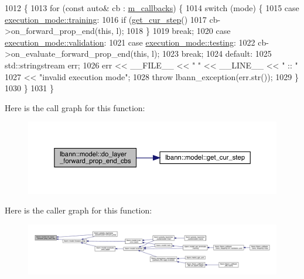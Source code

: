 \begin{DoxyCode}
1012                                                                        \{
1013   \textcolor{keywordflow}{for} (\textcolor{keyword}{const} \textcolor{keyword}{auto}& cb : \hyperlink{classlbann_1_1model_a07b511fef30368494c2ad80922ffd0eb}{m\_callbacks}) \{
1014     \textcolor{keywordflow}{switch} (mode) \{
1015     \textcolor{keywordflow}{case} \hyperlink{base_8hpp_a2781a159088df64ed7d47cc91c4dc0a8ac185ddac8b5a8f5aa23c5b80bc12d214}{execution\_mode::training}:
1016       \textcolor{keywordflow}{if} (\hyperlink{classlbann_1_1model_ad0cdcba177434b52dc9c4a97be183a92}{get\_cur\_step}() %
1017         cb->on\_forward\_prop\_end(\textcolor{keyword}{this}, l);
1018       \}
1019       \textcolor{keywordflow}{break};
1020     \textcolor{keywordflow}{case} \hyperlink{base_8hpp_a2781a159088df64ed7d47cc91c4dc0a8aa617908b172c473cb8e8cda059e55bf0}{execution\_mode::validation}:
1021     \textcolor{keywordflow}{case} \hyperlink{base_8hpp_a2781a159088df64ed7d47cc91c4dc0a8aae2b1fca515949e5d54fb22b8ed95575}{execution\_mode::testing}:
1022       cb->on\_evaluate\_forward\_prop\_end(\textcolor{keyword}{this}, l);
1023       \textcolor{keywordflow}{break};
1024     \textcolor{keywordflow}{default}:
1025       std::stringstream err;
1026       err << \_\_FILE\_\_ << \textcolor{stringliteral}{" "} << \_\_LINE\_\_ << \textcolor{stringliteral}{" :: "}
1027           << \textcolor{stringliteral}{"invalid execution mode"};
1028       \textcolor{keywordflow}{throw} lbann\_exception(err.str());
1029     \}
1030   \}
1031 \}
\end{DoxyCode}
Here is the call graph for this function\+:\nopagebreak
\begin{figure}[H]
\begin{center}
\leavevmode
\includegraphics[width=350pt]{classlbann_1_1model_a7d6b891f58a7df9726e4f2c48d1f957a_cgraph}
\end{center}
\end{figure}
Here is the caller graph for this function\+:\nopagebreak
\begin{figure}[H]
\begin{center}
\leavevmode
\includegraphics[width=350pt]{classlbann_1_1model_a7d6b891f58a7df9726e4f2c48d1f957a_icgraph}
\end{center}
\end{figure}
